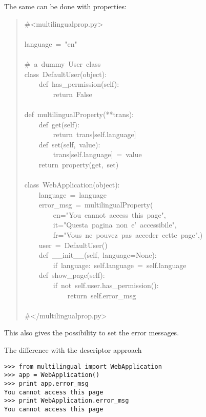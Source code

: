 \documentclass[10pt,a4paper,english]{article}
\begin{document}
The same can be done with properties:
\begin{quote}{\ttfamily \raggedright \noindent
{\#}<multilingualprop.py>~\\
~\\
language~=~"en"~\\
~\\
{\#}~a~dummy~User~class~\\
class~DefaultUser(object):~\\
~~~~def~has{\_}permission(self):~\\
~~~~~~~~return~False~\\
~~~~\\
def~multilingualProperty(**trans):~\\
~~~~def~get(self):~\\
~~~~~~~~return~trans{[}self.language]~\\
~~~~def~set(self,~value):~\\
~~~~~~~~trans{[}self.language]~=~value~~\\
~~~~return~property(get,~set)~\\
~\\
class~WebApplication(object):~\\
~~~~language~=~language~\\
~~~~error{\_}msg~=~multilingualProperty(~\\
~~~~~~~~en="You~cannot~access~this~page",~\\
~~~~~~~~it="Questa~pagina~non~e'~accessibile",~\\
~~~~~~~~fr="Vous~ne~pouvez~pas~acceder~cette~page",)~\\
~~~~user~=~DefaultUser()~\\
~~~~def~{\_}{\_}init{\_}{\_}(self,~language=None):~\\
~~~~~~~~if~language:~self.language~=~self.language~\\
~~~~def~show{\_}page(self):~\\
~~~~~~~~if~not~self.user.has{\_}permission():~\\
~~~~~~~~~~~~return~self.error{\_}msg~\\
~\\
{\#}</multilingualprop.py>
}\end{quote}

This also gives the possibility to set the error messages.

The difference with the descriptor approach
\begin{verbatim}>>> from multilingual import WebApplication
>>> app = WebApplication()
>>> print app.error_msg
You cannot access this page
>>> print WebApplication.error_msg
You cannot access this page\end{verbatim}
\end{document}

